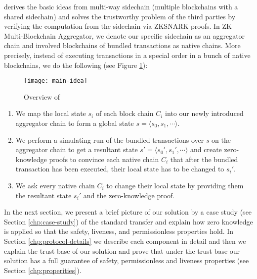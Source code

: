 \dprotocol derives the basic ideas from multi-way sidechain (multiple blockchains with a shared sidechain) and solves the trustworthy problem of the third parties by verifying the computation from the sidechain via ZKSNARK proofs. In ZK Multi-Blockchain Aggregator, we denote our specific sidechain as an aggregator chain and involved blockchains of bundled transactions as native chains. More precisely, instead of executing transactions in a special order in a bunch of native blockchains, we do the following (see Figure \ref{main-idea}):

\begin{figure}[!ht]
\centerline{\texttt{[image: main-idea]}}
\caption{Overview of \dprotocol}\label{main-idea}
\end{figure}
\begin{enumerate}[leftmargin=*]
\item We map the local state $s_i$ of each block chain $C_i$ into our newly introduced aggregator chain to form a global state $s = \langle s_0, s_1, \cdots \rangle$.
\item We perform a simulating run of the bundled transactions over $s$ on the aggregator chain to get a resultant state $s' = \langle s_0', s_1', \cdots \rangle$ and create zero-knowledge proofs to convince each native chain $C_i$ that after the bundled transaction has been executed, their local state has to be changed to $s_i'$.
\item We ask every native chain $C_i$ to change their local state by providing them the resultant state $s_i'$ and the zero-knowledge proof.
\end{enumerate}

\smallskip In the next section, we present a brief picture of our solution by a case study (see Section \ref{chp:case-study}) of the standard transfer and explain how zero knowledge is applied so that the safety, liveness, and permissionless properties hold. In Section \ref{chp:protocol-details} we describe each component in detail and then we explain the trust base of our solution and prove that under the trust base our solution has a full guarantee of safety, permissionless and liveness properties (see Section \ref{chp:properities}).

